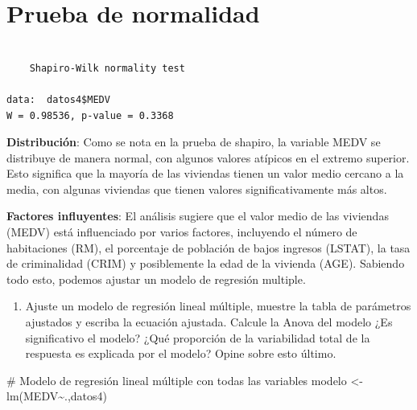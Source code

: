 \documentclass[
  letterpaper,
  DIV=11,
  numbers=noendperiod]{scrartcl}
\newenvironment{Shaded}{\begin{snugshade}}{\end{snugshade}}
\newcommand{\CommentTok}[1]{\textcolor[rgb]{0.37,0.37,0.37}{#1}}
\newcommand{\FunctionTok}[1]{\textcolor[rgb]{0.28,0.35,0.67}{#1}}
\newcommand{\NormalTok}[1]{\textcolor[rgb]{0.00,0.23,0.31}{#1}}
\newcommand{\OtherTok}[1]{\textcolor[rgb]{0.00,0.23,0.31}{#1}}
\newcommand{\SpecialCharTok}[1]{\textcolor[rgb]{0.37,0.37,0.37}{#1}}
\providecommand{\tightlist}{%
  \setlength{\itemsep}{0pt}\setlength{\parskip}{0pt}}\usepackage{longtable,booktabs,array}
\begin{document}
\section{Prueba de normalidad}\label{prueba-de-normalidad}

\begin{Shaded}
\end{Shaded}

\begin{verbatim}

    Shapiro-Wilk normality test

data:  datos4$MEDV
W = 0.98536, p-value = 0.3368
\end{verbatim}

\textbf{Distribución}: Como se nota en la prueba de shapiro, la variable
MEDV se distribuye de manera normal, con algunos valores atípicos en el
extremo superior. Esto significa que la mayoría de las viviendas tienen
un valor medio cercano a la media, con algunas viviendas que tienen
valores significativamente más altos.

\textbf{Factores influyentes}: El análisis sugiere que el valor medio de
las viviendas (MEDV) está influenciado por varios factores, incluyendo
el número de habitaciones (RM), el porcentaje de población de bajos
ingresos (LSTAT), la tasa de criminalidad (CRIM) y posiblemente la edad
de la vivienda (AGE). Sabiendo todo esto, podemos ajustar un modelo de
regresión multiple.

\begin{enumerate}
\def\labelenumi{\arabic{enumi}.}
\setcounter{enumi}{2}
\tightlist
\item
  Ajuste un modelo de regresión lineal múltiple, muestre la tabla de
  parámetros ajustados y escriba la ecuación ajustada. Calcule la Anova
  del modelo ¿Es significativo el modelo? ¿Qué proporción de la
  variabilidad total de la respuesta es explicada por el modelo? Opine
  sobre esto último.
\end{enumerate}

\begin{Shaded}
\begin{Highlighting}[]
\CommentTok{\# Modelo de regresión lineal múltiple con todas las variables }
\NormalTok{modelo }\OtherTok{\textless{}{-}} \FunctionTok{lm}\NormalTok{(MEDV}\SpecialCharTok{\textasciitilde{}}\NormalTok{.,datos4)}
\end{Highlighting}
\end{Shaded}
\end{document}
